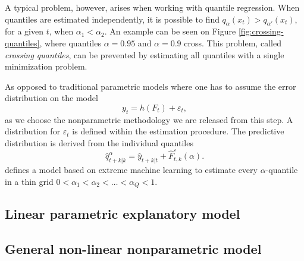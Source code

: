 A typical problem, however, arises when working with quantile regression. When quantiles are estimated independently, it is possible to find $q_{\alpha}(x_t) > q_{\alpha'}(x_t)$, for a given $t$, when $\alpha_1 < \alpha_2$. An example can be seen on Figure \ref{fig:crossing-quantiles}, where quantiles $\alpha = 0.95$ and $\alpha = 0.9$ cross. This problem, called \textit{crossing quantiles}, can be prevented by estimating all quantiles with a single minimization problem.



As opposed to traditional parametric models where one has to assume the error distribution on the model
\begin{equation}
y_t = h(F_t) + \varepsilon_t,
\end{equation}
as we choose the nonparametric methodology we are released from this step. A distribution for $\varepsilon_t$ is defined within the estimation procedure. The predictive distribution is derived from the individual quantiles
\begin{equation}
\hat q^\alpha_{t+k|k} = \hat y_{t+k|t} + \hat F^\varepsilon_{t,k}(\alpha).
\end{equation}
\cite{wan_direct_2017} defines a model based on extreme machine learning to estimate every $\alpha$-quantile in a thin grid $0 < \alpha_1 < \alpha_2 < \dots < \alpha_Q < 1$. 
	
	
	
	
	
	
\subsection{Linear parametric explanatory model}
	\blindtext
	
\subsection{General non-linear nonparametric model}
	\blindtext
	
